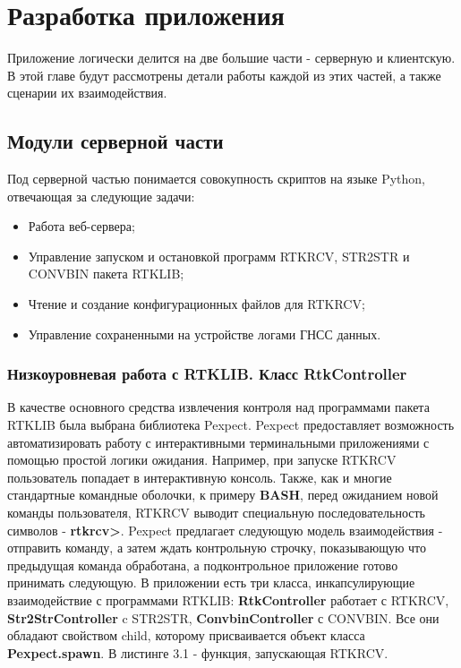 \chapter{Разработка приложения} \label{chapt3}

Приложение логически делится на две большие части - серверную и клиентскую. В этой главе будут рассмотрены детали работы каждой из этих частей, а также сценарии их взаимодействия.

\section{Модули серверной части} \label{sect3_1}

Под серверной частью понимается совокупность скриптов на языке Python, отвечающая за следующие задачи:

\begin{itemize}
  \item Работа веб-сервера;
  \item Управление запуском и остановкой программ RTKRCV, STR2STR и CONVBIN пакета RTKLIB;
  \item Чтение и создание конфигурационных файлов для RTKRCV;
  \item Управление сохраненными на устройстве логами ГНСС данных.
\end{itemize}

\subsection{Низкоуровневая работа с RTKLIB. Класс RtkController} \label{subsect3_1_1}

В качестве основного средства извлечения контроля над программами пакета RTKLIB была выбрана библиотека Pexpect. Pexpect \cite{pexpect-docs} предоставляет возможность автоматизировать работу с интерактивными терминальными приложениями с помощью простой логики ожидания. Например, при запуске RTKRCV пользователь попадает в интерактивную консоль. Также, как и многие стандартные командные оболочки, к примеру \textbf{BASH}, перед ожиданием новой команды пользователя, RTKRCV выводит специальную последовательность символов - \textbf{rtkrcv>}. Pexpect предлагает следующую модель взаимодействия - отправить команду, а затем ждать контрольную строчку, показывающую что предыдущая команда обработана, а подконтрольное приложение готово принимать следующую. В приложении есть три класса, инкапсулирующие взаимодействие с программами RTKLIB: \textbf{RtkController} работает с RTKRCV, \textbf{Str2StrController} c STR2STR, \textbf{ConvbinController} с CONVBIN. Все они обладают свойством child, которому присваивается объект класса \textbf{Pexpect.spawn}. В листинге 3.1 - функция, запускающая RTKRCV.


